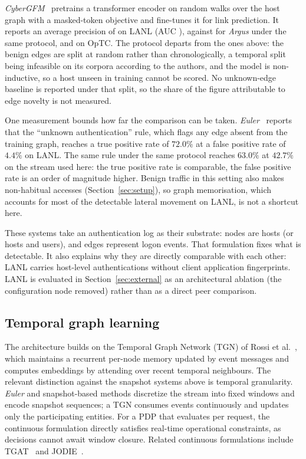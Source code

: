 \textit{CyberGFM}~\cite{cybergfm} pretrains a transformer encoder on random walks over the
host graph with a masked-token objective and fine-tunes it for link prediction. It reports an
average precision of \LitCgfmLanlAp{} on LANL (AUC \LitCgfmLanlAuc{}), against
\LitCgfmArgusLanlAp{} for \textit{Argus} under the same protocol, and \LitCgfmOptcAp{} on
OpTC. The protocol departs from the ones above: the benign edges are split at random rather
than chronologically, a temporal split being infeasible on its corpora according to the
authors, and the model is non-inductive, so a host unseen in training cannot be scored. No
unknown-edge baseline is reported under that split, so the share of the figure attributable to
edge novelty is not measured.

One measurement bounds how far the comparison can be taken. \textit{Euler}~\cite{euler}
reports that the ``unknown authentication'' rule, which flags any edge absent from the
training graph, reaches a true positive rate of $72.0\%$ at a false positive rate of $4.4\%$
on LANL. The same rule under the same protocol reaches $63.0\%$ at $42.7\%$ on the stream
used here: the true positive rate is comparable, the false positive rate is an order of
magnitude higher. Benign traffic in this setting also makes non-habitual accesses
(Section~\ref{sec:setup}), so graph memorisation, which accounts for most of the detectable
lateral movement on LANL, is not a shortcut here.

These systems take an authentication log as their substrate: nodes are
hosts (or hosts and users), and edges represent logon events. That formulation fixes what is
detectable. It also explains why they are directly comparable with each other:
LANL carries host-level authentications without client application fingerprints.
LANL is evaluated in Section~\ref{sec:external} as an architectural ablation
(the configuration node removed) rather than as a direct peer comparison.

\subsection{Temporal graph learning}

The architecture builds on the Temporal Graph Network (TGN) of Rossi et al.~\cite{tgn},
which maintains a recurrent per-node memory updated by event messages and computes
embeddings by attending over recent temporal neighbours. The relevant distinction
against the snapshot systems above is temporal granularity. \textit{Euler} and snapshot-based methods discretize the stream into fixed windows and encode snapshot sequences;
a TGN consumes events continuously and updates only the participating entities.
For a PDP that evaluates per request, the continuous formulation directly satisfies
real-time operational constraints, as decisions cannot await window closure. Related continuous
formulations include TGAT~\cite{tgat} and JODIE~\cite{jodie}.


